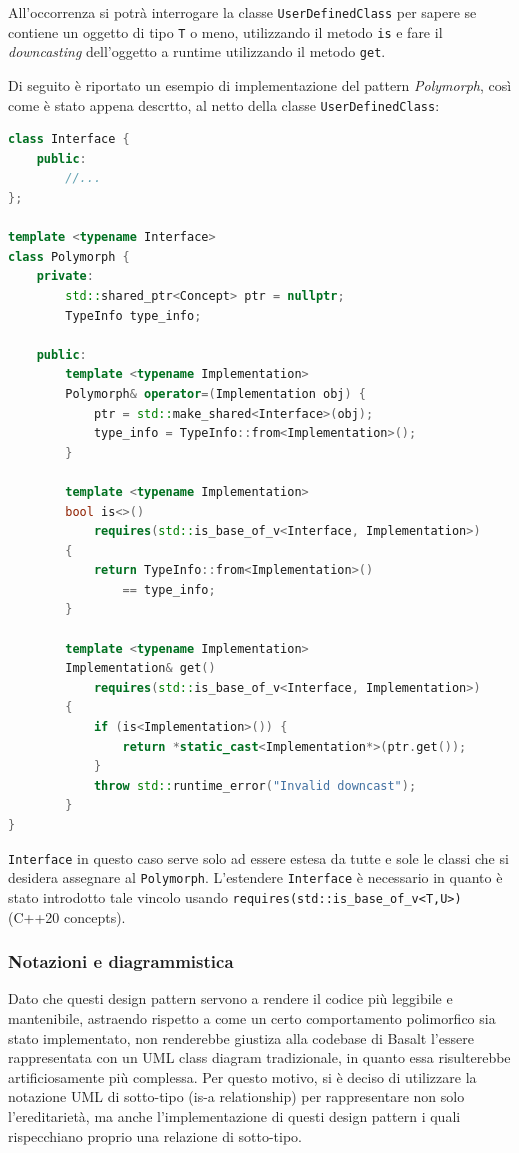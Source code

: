 All'occorrenza si potrà interrogare la classe \texttt{UserDefinedClass} per sapere se contiene un oggetto di tipo \texttt{T}
o meno, utilizzando il metodo \texttt{is} e fare il \textit{downcasting} dell'oggetto a runtime utilizzando il metodo \texttt{get}. \\

\newpage

Di seguito è riportato un esempio di implementazione del pattern \textit{Polymorph}, così come è stato appena descrtto,
al netto della classe \texttt{UserDefinedClass}: \\

\vspace{0.5cm}
\begin{lstlisting}[language=C++, frame=single]
class Interface {
    public:
        //...
};

template <typename Interface>
class Polymorph {
    private:
        std::shared_ptr<Concept> ptr = nullptr;
        TypeInfo type_info;

    public:
        template <typename Implementation>
        Polymorph& operator=(Implementation obj) {
            ptr = std::make_shared<Interface>(obj);
            type_info = TypeInfo::from<Implementation>();
        }

        template <typename Implementation>
        bool is<>() 
            requires(std::is_base_of_v<Interface, Implementation>)
        { 
            return TypeInfo::from<Implementation>() 
                == type_info; 
        }

        template <typename Implementation>
        Implementation& get() 
            requires(std::is_base_of_v<Interface, Implementation>)
        {
            if (is<Implementation>()) {
                return *static_cast<Implementation*>(ptr.get());
            }
            throw std::runtime_error("Invalid downcast");
        }
}
\end{lstlisting}
\vspace{0.5cm}

\texttt{Interface} in questo caso serve solo ad essere estesa da tutte e sole le classi che si desidera 
assegnare al \texttt{Polymorph}. L'estendere \texttt{Interface} è necessario in quanto è stato 
introdotto tale vincolo usando \texttt{requires(std::is\_base\_of\_v<T,U>)} (C++20 concepts).

\newpage

\subsubsection{Notazioni e diagrammistica}
Dato che questi design pattern servono a rendere il codice più leggibile e mantenibile, astraendo rispetto 
a come un certo comportamento polimorfico sia stato implementato, non renderebbe giustiza alla codebase di Basalt 
l'essere rappresentata con un UML class diagram tradizionale, in quanto essa risulterebbe artificiosamente più complessa. Per 
questo motivo, si è deciso di utilizzare la notazione UML di sotto-tipo (is-a relationship) per rappresentare
non solo l'ereditarietà, ma anche l'implementazione di questi design pattern i quali rispecchiano proprio una 
relazione di sotto-tipo. \\

